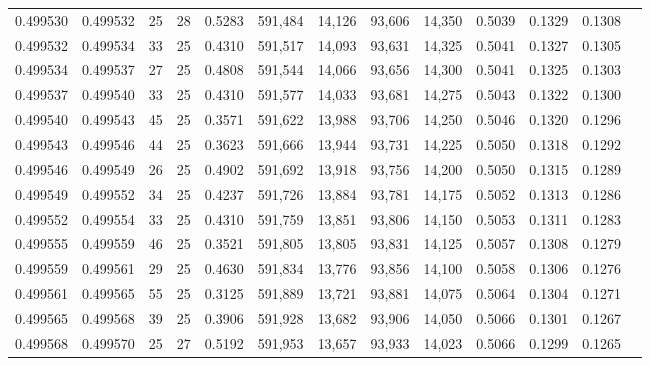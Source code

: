 \begin{tabular}{rrrrrrrrrrrrr}
0.499530 & 0.499532 &    25 &  28 &                                     0.5283 & 591,484 &  14,126 &  93,606 &  14,350 & 0.5039 & 0.1329 & 0.1308 \\
0.499532 & 0.499534 &    33 &  25 &                                     0.4310 & 591,517 &  14,093 &  93,631 &  14,325 & 0.5041 & 0.1327 & 0.1305 \\
0.499534 & 0.499537 &    27 &  25 &                                     0.4808 & 591,544 &  14,066 &  93,656 &  14,300 & 0.5041 & 0.1325 & 0.1303 \\
0.499537 & 0.499540 &    33 &  25 &                                     0.4310 & 591,577 &  14,033 &  93,681 &  14,275 & 0.5043 & 0.1322 & 0.1300 \\
0.499540 & 0.499543 &    45 &  25 &                                     0.3571 & 591,622 &  13,988 &  93,706 &  14,250 & 0.5046 & 0.1320 & 0.1296 \\
0.499543 & 0.499546 &    44 &  25 &                                     0.3623 & 591,666 &  13,944 &  93,731 &  14,225 & 0.5050 & 0.1318 & 0.1292 \\
0.499546 & 0.499549 &    26 &  25 &                                     0.4902 & 591,692 &  13,918 &  93,756 &  14,200 & 0.5050 & 0.1315 & 0.1289 \\
0.499549 & 0.499552 &    34 &  25 &                                     0.4237 & 591,726 &  13,884 &  93,781 &  14,175 & 0.5052 & 0.1313 & 0.1286 \\
0.499552 & 0.499554 &    33 &  25 &                                     0.4310 & 591,759 &  13,851 &  93,806 &  14,150 & 0.5053 & 0.1311 & 0.1283 \\
0.499555 & 0.499559 &    46 &  25 &                                     0.3521 & 591,805 &  13,805 &  93,831 &  14,125 & 0.5057 & 0.1308 & 0.1279 \\
0.499559 & 0.499561 &    29 &  25 &                                     0.4630 & 591,834 &  13,776 &  93,856 &  14,100 & 0.5058 & 0.1306 & 0.1276 \\
0.499561 & 0.499565 &    55 &  25 &                                     0.3125 & 591,889 &  13,721 &  93,881 &  14,075 & 0.5064 & 0.1304 & 0.1271 \\
0.499565 & 0.499568 &    39 &  25 &                                     0.3906 & 591,928 &  13,682 &  93,906 &  14,050 & 0.5066 & 0.1301 & 0.1267 \\
0.499568 & 0.499570 &    25 &  27 &                                     0.5192 & 591,953 &  13,657 &  93,933 &  14,023 & 0.5066 & 0.1299 & 0.1265 \\

\end{tabular}
